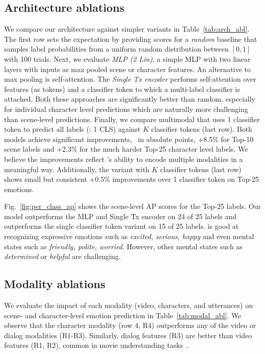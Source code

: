 \subsection{Architecture ablations}
\label{sec:abl:arch}
We compare our architecture against simpler variants in Table~\ref{tab:arch_abl}.
The first row sets the expectation by providing scores for a \emph{random} baseline
that samples label probabilities from a uniform random distribution between $[0, 1]$ with 100 trials.
Next, we evaluate \emph{MLP (2 Lin)}, a simple MLP with two linear layers with inputs as max pooled scene or character features.
An alternative to max pooling is self-attention.
The \emph{Single Tx encoder} performs self-attention over features (as tokens) and a classifier token to which a multi-label classifier is attached.
Both these approaches are significantly better than random, especially for individual character level predictions which are naturally more challenging than scene-level predictions. Finally, we compare multimodal \modelname{} that uses 1 classifier token to predict all labels (\modelname: 1 CLS) against $K$ classifier tokens (last row).
Both models achieve significant improvements, \eg~in absolute points, +8.5\% for Top-10 scene labels and +2.3\% for the much harder Top-25 character level labels.
We believe the improvements reflect \modelname{}'s ability to encode multiple modalities in a meaningful way.
Additionally, the variant with $K$ classifier tokens (last row) shows small but consistent +0.5\% improvements over 1 classifier token on Top-25 emotions.

Fig.~\ref{fig:per_class_ap} shows the scene-level AP scores for the Top-25 labels.
Our model outperforms the MLP and Single Tx encoder on 24 of 25 labels and outperforms the single classifier token variant on 15 of 25 labels.
\modelname{} is good at recognizing expressive emotions such as \emph{excited, serious, happy} and even mental states such as \emph{friendly, polite, worried}.
However, other mental states such as \emph{determined} or \emph{helpful} are challenging.


\subsection{Modality ablations}
\label{sec:abl:modality}
We evaluate the impact of each modality (video, characters, and utterances) on scene- and character-level emotion prediction in Table~\ref{tab:modal_abl}.
We observe that the character modality (row 4, R4) outperforms any of the video or dialog modalities (R1-R3).
Similarly, dialog features (R3) are better than video features (R1, R2), common in movie understanding tasks~\cite{moviegraphs, movieqa}.


